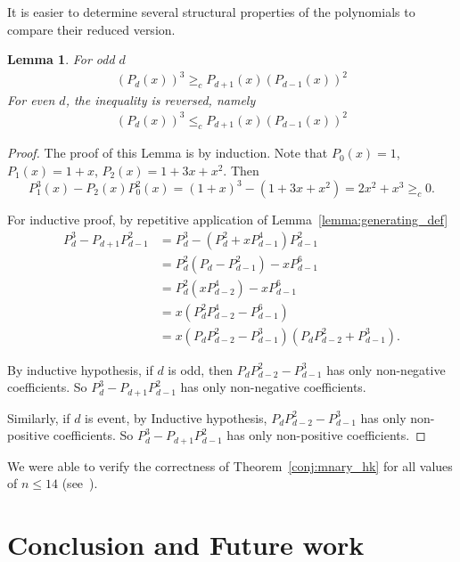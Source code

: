 \documentclass{amsart}
\newtheorem{lemma}[theorem]{Lemma}
\theoremstyle{definition}
\begin{document}
It is easier to determine several structural properties of the polynomials to compare their reduced version.

\begin{lemma}
	For odd $d$
	\begin{align*}
		(P_{d }(x))^3 \geq_{c}  P_{d +1}(x)(P_{d -1}(x))^2
	\end{align*}
	For even $d$, the inequality is reversed, namely
	\begin{align*}
		(P_{d}(x))^3 \leq_{c}  P_{d +1}(x)(P_{d - 1}(x))^2
	\end{align*}
\end{lemma}
\begin{proof}
	The proof of this Lemma is by induction. Note that $P_{0}(x)=1$, $P_{1}(x)=1+x$, $P_2(x)=1+3x+x^2$. Then $$P_{1}^3(x)-P_{2}(x)P_{0}^2(x)=(1+x)^3-(1+3x+x^2)=2x^2+x^3\geq_{c}0.$$

	For inductive proof, by repetitive application of Lemma~\ref{lemma:generating_def}
	\begin{align*}
		P_{d}^{3}-P_{d+1}P_{d-1}^2 & =P_{d}^{3}-(P_{d}^2+xP_{d-1}^4)P_{d-1}^2                       \\
		                           & =P_{d}^2(P_{d}-P_{d-1}^2)-xP_{d-1}^6                           \\
		                           & = P_{d}^2(xP_{d-2}^4)-xP_{d-1}^{6}                             \\
		                           & = x(P_{d}^2 P_{d-2}^4 - P_{d-1}^6)                             \\
		                           & = x(P_{d} P_{d-2}^2 - P_{d-1}^3)(P_{d} P_{d-2}^2 + P_{d-1}^3).
	\end{align*}

	By inductive hypothesis, if $d$ is odd, then $P_{d} P_{d-2}^2 - P_{d-1}^3$ has only non-negative coefficients. So $P_{d}^{3}-P_{d+1}P_{d-1}^2$ has only non-negative coefficients.

	Similarly, if $d$ is event, by Inductive hypothesis, $P_{d} P_{d-2}^2 - P_{d-1}^3$ has only non-positive coefficients. So $P_{d}^{3}-P_{d+1}P_{d-1}^2$ has only non-positive coefficients.

\end{proof}

We were able to verify the correctness of Theorem~\ref{conj:mnary_hk} for all values of $n\leq 14$ (see~\cite{Maharjan_Exploring_Perfect_Binary}).


\section{Conclusion and Future work}
\end{document}
